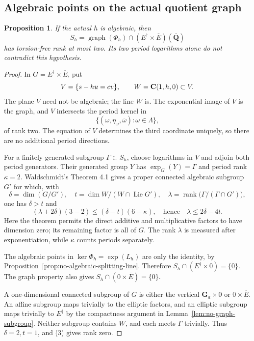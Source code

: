 \documentclass[11pt]{article}
\newtheorem{proposition}[theorem]{Proposition}
\theoremstyle{definition}\newtheorem{definition}[theorem]{Definition}
\theoremstyle{remark}\newtheorem{remark}[theorem]{Remark}
\newcommand{\Qb}{\overline{\mathbf Q}}\newcommand{\Fp}{\mathbf F_p}
\DeclareMathOperator{\Lie}{Lie}\DeclareMathOperator{\trdeg}{trdeg}
\begin{document}
\subsection{Algebraic points on the actual quotient graph}
\begin{proposition}\label{prop:graph-rank}
If the actual $h$ is algebraic, then
\[
 S_h=\operatorname{graph}(\Phi_h)\cap(E^\dagger\times\overline E)(\Qb)
\]
has torsion-free rank at most two. Its two period logarithms alone do not contradict this hypothesis.
\end{proposition}
\begin{proof}
In $G=E^\dagger\times\overline E$, put
\[
 V=\{s-hu=cv\},\qquad W=\mathbf C(1,h,0)\subset V.
\]
The plane $V$ need not be algebraic; the line $W$ is. The exponential image of $V$ is the graph, and $V$ intersects the period kernel in
\[
             \{(\omega,\eta_\omega,\overline\omega):\omega\in\Lambda\},
\]
of rank two. The equation of $V$ determines the third coordinate uniquely, so there are no additional period directions.

For a finitely generated subgroup $\Gamma\subset S_h$, choose logarithms in $V$ and adjoin both period generators. Their generated group $Y$ has $\exp_G(Y)=\Gamma$ and period rank $\kappa=2$. Waldschmidt's Theorem 4.1 \cite[printed pp.~385--386, PDF pp.~6--7]{WaldschmidtSubgroup} gives a proper connected algebraic subgroup $G'$ for which, with
\[
 \delta=\dim(G/G'),\quad
 t=\dim W/(W\cap\Lie G'),\quad
 \lambda=\operatorname{rank}\bigl(\Gamma/(\Gamma\cap G')\bigr),
\]
one has $\delta>t$ and
\[
                 (\lambda+2\delta)(3-2)
                      \le(\delta-t)(6-\kappa),
 \quad\text{hence}\quad\lambda\le2\delta-4t.             \tag{3}
\]
Here the theorem permits the direct additive and multiplicative factors to have dimension zero; its remaining factor is all of $G$. The rank $\lambda$ is measured after exponentiation, while $\kappa$ counts periods separately.

The algebraic points in $\ker\Phi_h=\exp(L_h)$ are only the identity, by Proposition~\ref{prop:no-algebraic-splitting-line}. Therefore
$S_h\cap(E^\dagger\times0)=\{0\}$. The graph property also gives $S_h\cap(0\times\overline E)=\{0\}$.

A one-dimensional connected subgroup of $G$ is either the vertical $\mathbf G_a\times0$ or $0\times\overline E$. An affine subgroup maps trivially to the elliptic factors, and an elliptic subgroup maps trivially to $E^\dagger$ by the compactness argument in Lemma~\ref{lem:no-graph-subgroup}. Neither subgroup contains $W$, and each meets $\Gamma$ trivially. Thus $\delta=2,t=1$, and (3) gives rank zero.


\end{proof}
\end{document}
